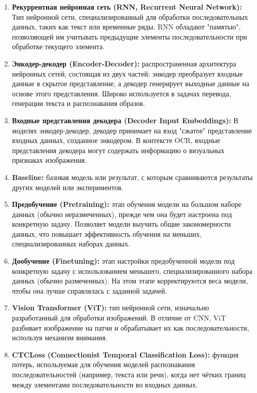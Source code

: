 \begin{enumerate}
    \item \textbf{Рекуррентная нейронная сеть (RNN, Recurrent Neural Network):}  Тип  нейронной  сети,  специализированный  для  обработки  последовательных  данных,  таких  как  текст  или  временные  ряды.  RNN  обладают  "памятью",  позволяющей  им  учитывать  предыдущие  элементы  последовательности  при  обработке  текущего  элемента.

    \item \textbf{Энкодер-декодер (Encoder-Decoder):}  распространенная архитектура нейронных сетей, состоящая из двух частей:  энкодер преобразует входные данные в скрытое представление, а декодер  генерирует выходные данные на основе этого представления.  Широко используется в задачах перевода,  генерации текста и распознавания образов.

    \item  \textbf{Входные представления декодера (Decoder Input Embeddings):} В моделях энкодер-декодер, декодер принимает на вход  "сжатое" представление входных данных, созданное энкодером.  В контексте OCR,  входные представления декодера  могут содержать информацию о визуальных  признаках  изображения.

    \item  \textbf{Baseline:} базовая модель или результат, с которым сравниваются результаты  других моделей или  экспериментов. 

    \item  \textbf{Предобучение (Pretraining):}  этап обучения модели на большом наборе данных (обычно неразмеченных),  прежде чем она будет настроена под конкретную задачу.  Позволяет модели  выучить общие закономерности данных, что  повышает  эффективность  обучения на меньших, специализированных наборах данных.

    \item  \textbf{Дообучение (Finetuning):}  этап  настройки  предобученной  модели  под  конкретную задачу с использованием  меньшего, специализированного набора данных (обычно размеченных). На этом этапе  корректируются  веса модели,  чтобы  она  лучше  справлялась  с  заданной  задачей. 

    \item  \textbf{ Vision Transformer (ViT):} тип  нейронной  сети,  изначально  разработанный  для  обработки  изображений.  В  отличие  от  CNN, ViT  разбивает  изображение  на  патчи  и  обрабатывает  их  как  последовательности, используя  механизм  внимания.  

    \item  \textbf{ CTCLoss (Connectionist Temporal Classification Loss):} функция  потерь,  используемая  для  обучения  моделей  распознавания  последовательностей  (например,  текста  или  речи),  когда  нет  чётких  границ  между  элементами  последовательности  во  входных  данных. 


\end{enumerate}
